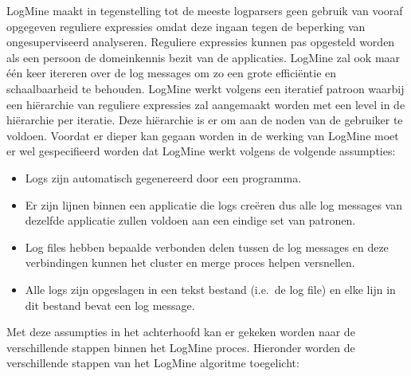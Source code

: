 LogMine maakt in tegenstelling tot de meeste logparsers geen gebruik van vooraf opgegeven reguliere expressies omdat deze ingaan tegen de beperking van ongesuperviseerd analyseren. Reguliere expressies kunnen pas opgesteld worden als een persoon de domeinkennis bezit van de applicaties. LogMine zal ook maar één keer itereren over de log messages om zo een grote efficiëntie en schaalbaarheid te behouden. LogMine werkt volgens een iteratief patroon waarbij een hiërarchie van reguliere expressies zal aangemaakt worden met een level in de hiërarchie per iteratie. Deze hiërarchie is er om aan de noden van de gebruiker te voldoen. Voordat er dieper kan gegaan worden in de werking van LogMine moet er wel gespecifieerd worden dat LogMine werkt volgens de volgende assumpties:
\begin{itemize}
    \item Logs zijn automatisch gegenereerd door een programma.
    \item Er zijn lijnen binnen een applicatie die logs creëren dus alle log messages van dezelfde applicatie zullen voldoen aan een eindige set van patronen.
    \item Log files hebben bepaalde verbonden delen tussen de log messages en deze verbindingen kunnen het cluster en merge proces helpen versnellen.
    \item Alle logs zijn opgeslagen in een tekst bestand (i.e.\ de log file) en elke lijn in dit bestand bevat een log message.
\end{itemize}

Met deze assumpties in het achterhoofd kan er gekeken worden naar de verschillende stappen binnen het LogMine proces. Hieronder worden de verschillende stappen van het LogMine algoritme toegelicht:

